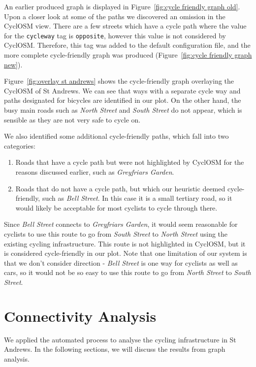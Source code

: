\documentclass[12pt,a4paper]{report}
\begin{document}
An earlier produced graph is displayed in Figure~\ref{fig:cycle friendly graph old}. Upon a closer look at some of the paths we discovered an omission in the CyclOSM view. There are a few streets which have a cycle path where the value for the \texttt{cycleway} tag is \texttt{opposite}, however this value is not considered by CyclOSM. Therefore, this tag was added to the default configuration file, and the more complete cycle-friendly graph was produced (Figure~\ref{fig:cycle friendly graph new}).

Figure~\ref{fig:overlay st andrews} shows the cycle-friendly graph overlaying the CyclOSM of St Andrews. We can see that ways with a separate cycle way and paths designated for bicycles are identified in our plot. On the other hand, the busy main roads such as \textit{North Street} and \textit{South Street} do not appear, which is sensible as they are not very safe to cycle on. 

We also identified some additional cycle-friendly paths, which fall into two categories: \begin{enumerate}
    \item Roads that have a cycle path but were not highlighted by CyclOSM for the reasons discussed earlier, such as \textit{Greyfriars Garden}.
    \item Roads that do not have a cycle path, but which our heuristic deemed cycle-friendly, such as \textit{Bell Street}. In this case it is a small tertiary road, so it would likely be acceptable for most cyclists to cycle through there.
\end{enumerate}

Since \textit{Bell Street} connects to \textit{Greyfriars Garden}, it would seem reasonable for cyclists to use this route to go from \textit{South Street} to \textit{North Street} using the existing cycling infrastructure. This route is not highlighted in CyclOSM, but it is considered cycle-friendly in our plot. Note that one limitation of our system is that we don't consider direction - \textit{Bell Street} is one way for cyclists as well as cars, so it would not be so easy to use this route to go from \textit{North Street} to \textit{South Street}.

\section{Connectivity Analysis}\label{sec:connectivity}
We applied the automated process to analyse the cycling infrastructure in St Andrews. In the following sections, we will discuss the results from graph analysis.
\end{document}
